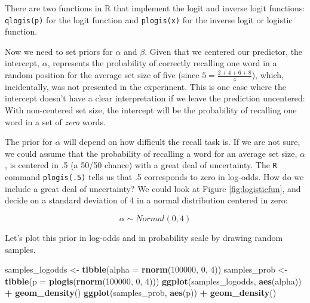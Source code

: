 \documentclass[12pt,]{krantz}
\newenvironment{Shaded}{\begin{snugshade}}{\end{snugshade}}
\newcommand{\DataTypeTok}[1]{\textcolor[rgb]{0.13,0.29,0.53}{#1}}
\newcommand{\DecValTok}[1]{\textcolor[rgb]{0.00,0.00,0.81}{#1}}
\newcommand{\KeywordTok}[1]{\textcolor[rgb]{0.13,0.29,0.53}{\textbf{#1}}}
\newcommand{\NormalTok}[1]{#1}
\newcommand{\OperatorTok}[1]{\textcolor[rgb]{0.81,0.36,0.00}{\textbf{#1}}}
\newcommand{\StringTok}[1]{\textcolor[rgb]{0.31,0.60,0.02}{#1}}
\theoremstyle{definition}
\theoremstyle{definition}
\theoremstyle{definition}
\theoremstyle{remark}
\begin{document}
There are two functions in R that implement the logit and inverse logit functions: \texttt{qlogis(p)} for the logit function and \texttt{plogis(x)} for the inverse logit or logistic function.

Now we need to set priors for \(\alpha\) and \(\beta\).
Given that we centered our predictor, the intercept, \(\alpha\), represents the probability of correctly recalling one word in a random position for the average set size of five (since \(5 = \frac{2+4+6+8}{4}\)), which, incidentally, was not presented in the experiment. This is one case where the intercept doesn't have a clear interpretation if we leave the prediction uncentered: With non-centered set size, the intercept will be the probability of recalling one word in a set of \emph{zero} words.

The prior for \(\alpha\) will depend on how difficult the recall task is. If we are not sure, we could assume that the probability of recalling a word for an average set size, \(\alpha\), is centered in .5 (a 50/50 chance) with a great deal of uncertainty. The \texttt{R} command \texttt{plogis(.5)} tells us that .5 corresponds to zero in log-odds. How do we include a great deal of uncertainty? We could look at Figure \ref{fig:logisticfun}, and decide on a standard deviation of 4 in a normal distribution centered in zero:

\begin{equation}
\alpha \sim Normal(0, 4) 
\end{equation}

Let's plot this prior in log-odds and in probability scale by drawing random samples.



\begin{Shaded}
\begin{Highlighting}[]
\NormalTok{samples_logodds <-}\StringTok{ }\KeywordTok{tibble}\NormalTok{(}\DataTypeTok{alpha =} \KeywordTok{rnorm}\NormalTok{(}\DecValTok{100000}\NormalTok{, }\DecValTok{0}\NormalTok{, }\DecValTok{4}\NormalTok{))}
\NormalTok{samples_prob <-}\StringTok{ }\KeywordTok{tibble}\NormalTok{(}\DataTypeTok{p =} \KeywordTok{plogis}\NormalTok{(}\KeywordTok{rnorm}\NormalTok{(}\DecValTok{100000}\NormalTok{, }\DecValTok{0}\NormalTok{, }\DecValTok{4}\NormalTok{)))}
\KeywordTok{ggplot}\NormalTok{(samples_logodds, }\KeywordTok{aes}\NormalTok{(alpha)) }\OperatorTok{+}
\StringTok{    }\KeywordTok{geom_density}\NormalTok{()}
\KeywordTok{ggplot}\NormalTok{(samples_prob, }\KeywordTok{aes}\NormalTok{(p)) }\OperatorTok{+}
\StringTok{    }\KeywordTok{geom_density}\NormalTok{()}
\end{Highlighting}
\end{Shaded}
\end{document}
